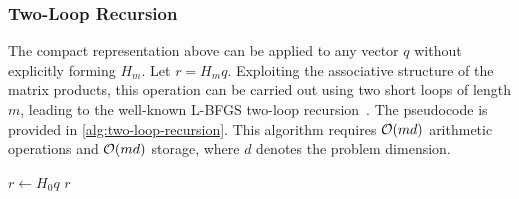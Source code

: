 \documentclass[0_en]{subfiles}
\begin{document}
\subsubsection{Two-Loop Recursion}

The compact representation above can be applied to any vector $q$ without explicitly forming $H_m$.
Let $r = H_m q$.
Exploiting the associative structure of the matrix products, this operation can be carried out using two short loops of length $m$, leading to the well-known L-BFGS two-loop recursion~\citep[Algorithm 7.4]{nocedal1999numerical}. The pseudocode is provided in \cref{alg:two-loop-recursion}.
This algorithm requires $\order{md}$ arithmetic operations and $\order{md}$ storage, where $d$ denotes the problem dimension.

\DontPrintSemicolon
\begin{algorithm}[t]
    \caption{L-BFGS Two-Loop Recursion for $r = H_m q$ \citep[Algorithm 7.4]{nocedal1999numerical}}
    \label{alg:two-loop-recursion}
    $r \gets H_0 q$\;
    \Return $r$\;
\end{algorithm}
\end{document}

